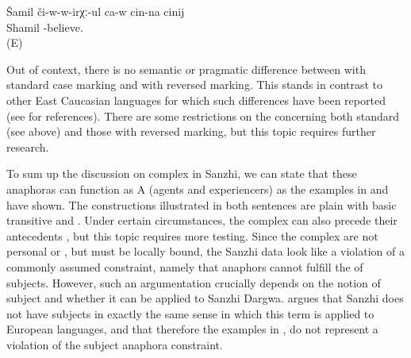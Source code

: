 \begin{exe}
	\ex	\label{ex:Rasul is believing in himself@13}
	\begin{xlist}
		\ex	\label{ex:Rasul is believing in himself@13A}
		\gll	Šamil	či-w-w-irχː-ul ca-w	cin-na	cinij\\
			Shamil	-believe.  	\\
		\glt	{} (E)

	\end{xlist}
\end{exe}


Out of context, there is no semantic or pragmatic difference between  with standard case marking and  with reversed marking. This stands in contrast to other East Caucasian languages for which such differences have been reported (see \citealp{Forker2014} for references). There are some restrictions on the  concerning both standard  (see above) and those with reversed marking, but this topic requires further research.
%

To sum up the discussion on complex  in Sanzhi, we can state that these anaphoras can function as A (agents and experiencers) as the examples in  and  have shown. The constructions illustrated in both sentences are plain  with basic transitive and . Under certain circumstances, the complex  can also precede their antecedents , but this topic requires more testing. Since the complex  are not personal or , but must be locally bound, the Sanzhi data look like a violation of a commonly assumed constraint, namely that anaphors cannot fulfill the  of subjects. However, such an argumentation crucially depends on the notion of subject and whether it can be applied to Sanzhi Dargwa. \citet{Forker2014} argues that Sanzhi does not have subjects in exactly the same sense in which this term is applied to European languages, and that therefore the examples in ,  do not represent a violation of the subject anaphora constraint.



